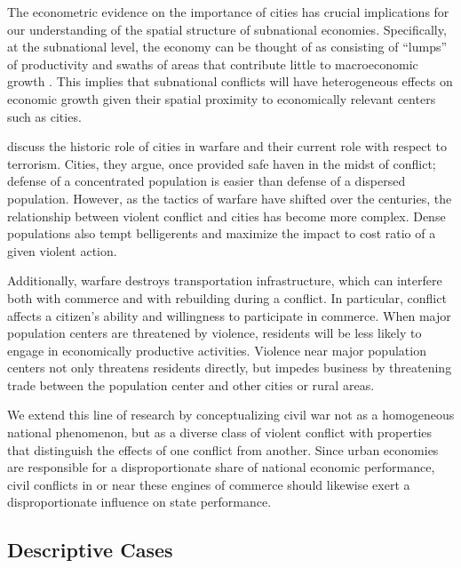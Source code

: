 The econometric evidence on the importance of cities has crucial implications for our understanding of the spatial structure of subnational economies. Specifically, at the subnational level, the economy can be thought of as consisting of ``lumps'' of productivity and swaths of areas that contribute little to macroeconomic growth \citep{venables:2005}. This implies that subnational conflicts will have heterogeneous effects on economic growth given their spatial proximity to economically relevant centers such as cities.

\citet{glaeser:shapiro:2002} discuss the historic role of cities in warfare and their current role with respect to terrorism. Cities, they argue, once provided safe haven in the midst of conflict; defense of a concentrated population is easier than defense of a dispersed population. However, as the tactics of warfare have shifted over the centuries, the relationship between violent conflict and cities has become more complex. Dense populations also tempt belligerents and maximize the impact to cost ratio of a given violent action. 

Additionally, warfare destroys transportation infrastructure, which can interfere both with commerce and with rebuilding during a conflict. In particular, conflict affects a citizen's ability and willingness to participate in commerce. When major population centers are threatened by violence, residents will be less likely to engage in economically productive activities. Violence near major population centers not only threatens residents directly, but impedes business by threatening trade between the population center and other cities or rural areas. 

We extend this line of research by conceptualizing civil war not as a homogeneous national phenomenon, but as a diverse class of violent conflict with properties that distinguish the effects of one conflict from another. Since urban economies are responsible for a disproportionate share of national economic performance, civil conflicts in or near these engines of commerce should likewise exert a disproportionate influence on state performance. 

\subsection{Descriptive Cases}

